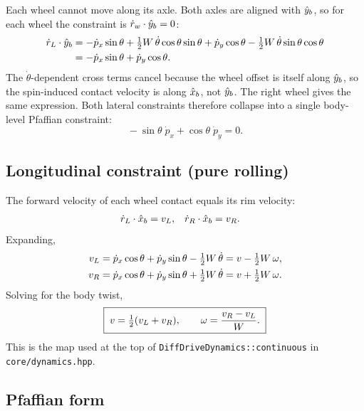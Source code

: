 Each wheel cannot move along its axle. Both axles are aligned with $\hat{y}_{b}$,
so for each wheel the constraint is $\dot r_w \cdot \hat{y}_{b} = 0$:
\begin{align}
    \dot r_L \cdot \hat{y}_{b}
    &= -\dot p_x \sin\theta
       + \tfrac{1}{2}W\,\dot\theta\cos\theta\sin\theta
       + \dot p_y \cos\theta
       - \tfrac{1}{2}W\,\dot\theta\sin\theta\cos\theta \notag\\
    &= -\dot p_x \sin\theta + \dot p_y \cos\theta.
\end{align}
The $\dot\theta$-dependent cross terms cancel because the wheel offset is
itself along $\hat{y}_{b}$, so the spin-induced contact velocity is along
$\hat{x}_{b}$, not $\hat{y}_{b}$. The right wheel gives the same expression. Both
lateral constraints therefore collapse into a single body-level Pfaffian
constraint:
\begin{equation}
    \boxed{\;-\sin\theta\;\dot p_x + \cos\theta\;\dot p_y = 0.\;}
    \label{eq:noslip}
\end{equation}

\subsection{Longitudinal constraint (pure rolling)}

The forward velocity of each wheel contact equals its rim velocity:
\begin{align}
    \dot r_L \cdot \hat{x}_{b} &= v_L,
    &
    \dot r_R \cdot \hat{x}_{b} &= v_R.
\end{align}
Expanding,
\begin{align}
    v_L &= \dot p_x \cos\theta + \dot p_y \sin\theta - \tfrac{1}{2}W\,\dot\theta
         = v - \tfrac{1}{2}W\,\omega, \\
    v_R &= \dot p_x \cos\theta + \dot p_y \sin\theta + \tfrac{1}{2}W\,\dot\theta
         = v + \tfrac{1}{2}W\,\omega.
\end{align}
Solving for the body twist,
\begin{equation}
    \boxed{\;
        v = \tfrac{1}{2}(v_L + v_R),
        \qquad
        \omega = \frac{v_R - v_L}{W}.
    \;}
    \label{eq:wheel-to-body}
\end{equation}
This is the map used at the top of \texttt{DiffDriveDynamics::continuous}
in \texttt{core/dynamics.hpp}.

\subsection{Pfaffian form}

